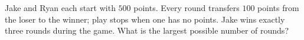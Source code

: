 Jake and Ryan each start with $500$ points. Every round transfers $100$ points from the loser to the winner; play stops when one has no points. Jake wins exactly three rounds during the game. What is the largest possible number of rounds?
